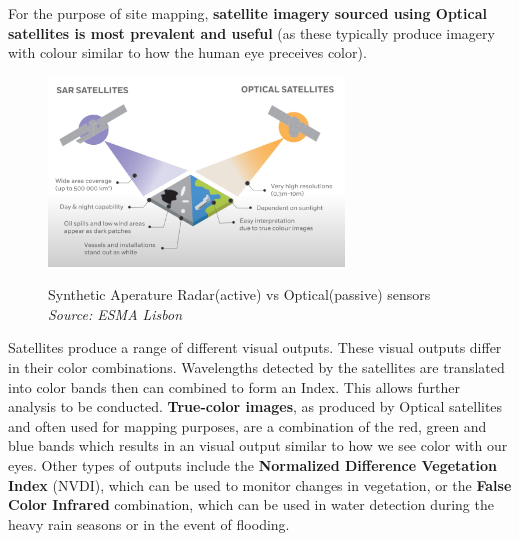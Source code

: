 \documentclass[
  a4paper,
  onecolumn,
  oneside]{book}
\begin{document}
For the purpose of site mapping, \textbf{satellite imagery sourced using
Optical satellites is most prevalent and useful} (as these typically
produce imagery with colour similar to how the human eye preceives
color).

\begin{figure}

\href{/part2/images/sar-optical.png}{\includegraphics[width=0.7\textwidth,height=\textheight]{part2/images/sar-optical.png}}

Synthetic Aperature Radar(active) vs Optical(passive) sensors
\emph{Source: ESMA Lisbon}

\end{figure}

\begin{tcolorbox}[enhanced jigsaw, opacitybacktitle=0.6, colbacktitle=quarto-callout-warning-color!10!white, breakable, coltitle=black, title=\textcolor{quarto-callout-warning-color}{\faExclamationTriangle}\hspace{0.5em}{Note on Colour bands}, toprule=.15mm, bottomrule=.15mm, colback=white, left=2mm, toptitle=1mm, bottomtitle=1mm, arc=.35mm, colframe=quarto-callout-warning-color-frame, titlerule=0mm, opacityback=0, rightrule=.15mm, leftrule=.75mm]

Satellites produce a range of different visual outputs. These visual
outputs differ in their color combinations. Wavelengths detected by the
satellites are translated into color bands then can combined to form an
Index. This allows further analysis to be conducted. \textbf{True-color
images}, as produced by Optical satellites and often used for mapping
purposes, are a combination of the red, green and blue bands which
results in an visual output similar to how we see color with our eyes.
Other types of outputs include the \textbf{Normalized Difference
Vegetation Index} (NVDI), which can be used to monitor changes in
vegetation, or the \textbf{False Color Infrared} combination, which can
be used in water detection during the heavy rain seasons or in the event
of flooding.

\end{tcolorbox}
\end{document}

